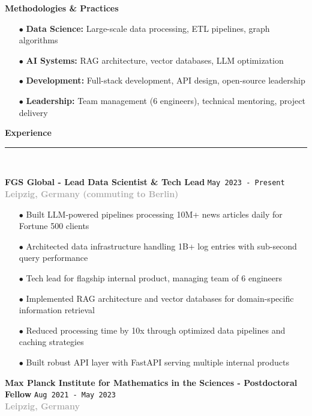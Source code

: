 \documentclass[11pt,a4paper]{article}
\newcommand{\sectiondivider}{%
    \vspace{2pt}\\%
    {\color{coral}\rule{30pt}{2pt}}\\%
    \vspace{8pt}%
}
\newcommand{\coralbullet}{{\color{coral}$\bullet$}\space}
\newcommand{\jobduration}[1]{%
    \textcolor{mediumgray}{\texttt{\small #1}}%
}
\newcommand{\companyname}[1]{%
    \textcolor{darkgray}{\textbf{#1}}%
}
\newcommand{\cvsectioncustom}[1]{%
    \vspace{12pt}%
    {\Large\color{navy}\textbf{#1}}%
    \sectiondivider%
}
\begin{document}
\vspace{6pt}
\textbf{Methodologies \& Practices}
\begin{itemize}[leftmargin=15pt,itemsep=2pt]
    \item[\coralbullet] \textbf{Data Science:} Large-scale data processing, ETL pipelines, graph algorithms
    \item[\coralbullet] \textbf{AI Systems:} RAG architecture, vector databases, LLM optimization
    \item[\coralbullet] \textbf{Development:} Full-stack development, API design, open-source leadership
    \item[\coralbullet] \textbf{Leadership:} Team management (6 engineers), technical mentoring, project delivery
\end{itemize}

\cvsectioncustom{Experience}

\textbf{\large\color{navy}FGS Global - Lead Data Scientist \& Tech Lead} \hfill \jobduration{May 2023 - Present}\\
\companyname{Leipzig, Germany (commuting to Berlin)}

\begin{itemize}[leftmargin=15pt,itemsep=3pt]
    \item[\coralbullet] Built LLM-powered pipelines processing 10M+ news articles daily for Fortune 500 clients
    \item[\coralbullet] Architected data infrastructure handling 1B+ log entries with sub-second query performance
    \item[\coralbullet] Tech lead for flagship internal product, managing team of 6 engineers
    \item[\coralbullet] Implemented RAG architecture and vector databases for domain-specific information retrieval
    \item[\coralbullet] Reduced processing time by 10x through optimized data pipelines and caching strategies
    \item[\coralbullet] Built robust API layer with FastAPI serving multiple internal products
\end{itemize}

\vspace{8pt}

\textbf{\large\color{navy}Max Planck Institute for Mathematics in the Sciences - Postdoctoral Fellow} \hfill \jobduration{Aug 2021 - May 2023}\\
\companyname{Leipzig, Germany}
\end{document}

